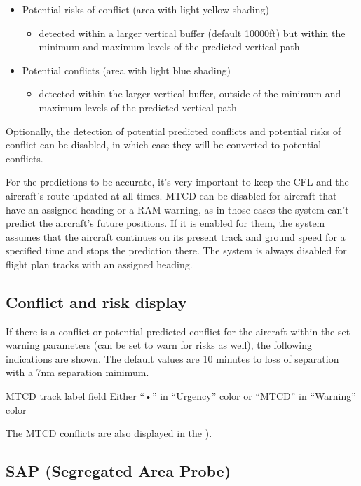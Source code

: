 \documentclass[11pt,a4paper,oldfontcommands]{memoir}
\begin{document}
\begin{itemize}
    \item Potential risks of conflict (area with light yellow shading)
    \begin{itemize}
        \item detected within a larger vertical buffer (default 10000ft) but within the minimum and maximum levels of the predicted vertical path
    \end{itemize}
    \item Potential conflicts (area with light blue shading)
    \begin{itemize}
        \item detected within the larger vertical buffer, outside of the minimum and maximum levels of the predicted vertical path
    \end{itemize}
\end{itemize}

Optionally, the detection of potential predicted conflicts and potential risks of conflict can be disabled, in which case they will be converted to potential conflicts.

For the predictions to be accurate, it’s very important to keep the CFL and the aircraft’s route updated at all times. MTCD can be disabled for aircraft that have an assigned heading or a RAM warning, as in those cases the system can’t predict the aircraft’s future positions. If it is enabled for them, the system assumes that the aircraft continues on its present track and ground speed for a specified time and stops the prediction there. The system is always disabled for flight plan tracks with an assigned heading.

\subsection*{Conflict and risk display}

If there is a conflict or potential predicted conflict for the aircraft within the set warning parameters (can be set to warn for risks as well), the following indications are shown. The default values are 10 minutes to loss of separation with a 7nm separation minimum.

MTCD track label field Either “•” in “Urgency” color or “MTCD” in “Warning” color

The MTCD conflicts are also displayed in the \textit{}).

\subsection{SAP (Segregated Area Probe)}
\end{document}
